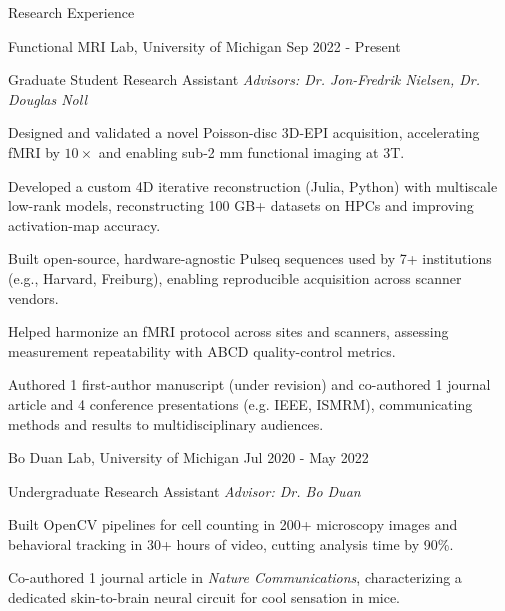 \documentclass{resume}
\begin{document}
\begin{rSection}{Research Experience}
    \begin{rSubsection}{Functional MRI Lab}{, University of Michigan \hfill {Sep 2022 - Present}}
    	\item {Graduate Student Research Assistant \hfill \textit{Advisors: Dr. Jon-Fredrik Nielsen, Dr. Douglas Noll}}
    	\begin{rSubsubsection}
            \item Designed and validated a novel Poisson-disc 3D-EPI acquisition, accelerating fMRI by $10\times$ and enabling sub-2 mm functional imaging at 3T.
            \item Developed a custom 4D iterative reconstruction (Julia, Python) with multiscale low-rank models, reconstructing 100 GB+ datasets on HPCs and improving activation-map accuracy.
            \item Built open-source, hardware-agnostic Pulseq sequences used by 7+ institutions (e.g., Harvard, Freiburg), enabling reproducible acquisition across scanner vendors.
            \item Helped harmonize an fMRI protocol across sites and scanners, assessing measurement repeatability with ABCD quality-control metrics.
            \item Authored 1 first-author manuscript (under revision) and co-authored 1 journal article and 4 conference presentations (e.g. IEEE, ISMRM), communicating methods and results to multidisciplinary audiences.
    	\end{rSubsubsection}
	\end{rSubsection}

    \begin{rSubsection}{Bo Duan Lab}{, University of Michigan \hfill {Jul 2020 - May 2022}}
	\item {Undergraduate Research Assistant \hfill \textit{Advisor: Dr. Bo Duan}}
	\begin{rSubsubsection}
        \item Built OpenCV pipelines for cell counting in 200+ microscopy images and behavioral tracking in 30+ hours of video, cutting analysis time by 90\%.
        \item Co-authored 1 journal article in \textit{Nature Communications}, characterizing a dedicated skin-to-brain neural circuit for cool sensation in mice.
	\end{rSubsubsection}
    \end{rSubsection}
\end{rSection}
\end{document}

